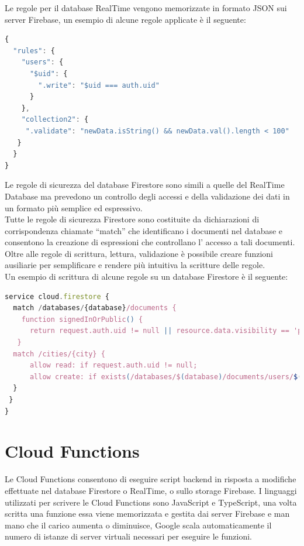 Le regole per il database RealTime vengono memorizzate in formato JSON sui server Firebase, un esempio di alcune regole applicate è il seguente:

\begin{lstlisting}[language=javascript,caption={Firebase Rules esempio }]
{
  "rules": {
    "users": {
      "$uid": {
        ".write": "$uid === auth.uid"
      }
    },
    "collection2": {
     ".validate": "newData.isString() && newData.val().length < 100"
   }
  }
}
\end{lstlisting}


Le regole di sicurezza del database Firestore sono simili a quelle del RealTime Database ma prevedono un controllo degli accessi e della validazione dei dati in un formato più semplice ed espressivo.\\
Tutte le regole di sicurezza Firestore sono costituite da dichiarazioni di corrispondenza chiamate ``match'' che identificano i documenti nel database e consentono la creazione di espressioni che controllano l' accesso a tali documenti.\\
Oltre alle regole di scrittura, lettura, validazione è possibile creare funzioni ausiliarie per semplificare e rendere più intuitiva la scritture delle regole.\\
Un esempio di scrittura di alcune regole su un database Firestore è il seguente:

\begin{lstlisting}[language=javascript,caption={Firestore Database Rules}]
service cloud.firestore {
  match /databases/{database}/documents {
    function signedInOrPublic() {
      return request.auth.uid != null || resource.data.visibility == 'public';
   }
  match /cities/{city} {
      allow read: if request.auth.uid != null;
      allow create: if exists(/databases/$(database)/documents/users/$(request.auth.uid))
  }
 }
}
\end{lstlisting}



\section{Cloud Functions}                 %

Le Cloud Functions consentono di eseguire script backend in risposta a modifiche effettuate nel database Firestore o RealTime, o sullo storage Firebase. I linguaggi utilizzati per scrivere le Cloud Functions sono JavaScript e TypeScript, una volta scritta una funzione essa viene memorizzata e gestita dai server Firebase e man mano che il carico aumenta o diminuisce, Google scala automaticamente il numero di istanze di server virtuali necessari per eseguire le funzioni.


